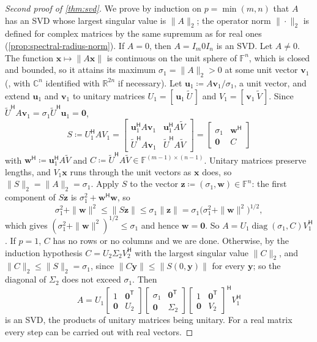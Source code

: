 \begin{proof}[Second proof of \cref{thm:svd}]
We prove by induction on $p=\min(m,n)$ that $A$ has an SVD whose largest singular value is $\|A\|_2$; the operator norm $\|\cdot\|_2$ is defined for complex matrices by the same supremum as for real ones (\cref{prop:spectral-radius-norm}). If $A=0$, then $A=I_m0I_n$ is an SVD. Let $A\ne0$. The function $\mathbf x\mapsto\|A\mathbf x\|$ is continuous on the unit sphere of $\mathbb F^n$, which is closed and bounded, so it attains its maximum $\sigma_1=\|A\|_2>0$ at some unit vector $\mathbf v_1$ (, with $\mathbb C^n$ identified with $\mathbb R^{2n}$ if necessary). Let $\mathbf u_1\coloneqq A\mathbf v_1/\sigma_1$, a unit vector, and extend $\mathbf u_1$ and $\mathbf v_1$ to unitary matrices $U_1=[\,\mathbf u_1\ \tilde U\,]$ and $V_1=[\,\mathbf v_1\ \tilde V\,]$. Since $\tilde U^{\mathsf H}A\mathbf v_1=\sigma_1\tilde U^{\mathsf H}\mathbf u_1=\mathbf 0$,
\[
S\coloneqq U_1^{\mathsf H}AV_1=\begin{bmatrix}\mathbf u_1^{\mathsf H}A\mathbf v_1&\mathbf u_1^{\mathsf H}A\tilde V\\\tilde U^{\mathsf H}A\mathbf v_1&\tilde U^{\mathsf H}A\tilde V\end{bmatrix}=\begin{bmatrix}\sigma_1&\mathbf w^{\mathsf H}\\\mathbf 0&C\end{bmatrix}
\]
with $\mathbf w^{\mathsf H}\coloneqq\mathbf u_1^{\mathsf H}A\tilde V$ and $C\coloneqq\tilde U^{\mathsf H}A\tilde V\in\mathbb F^{(m-1)\times(n-1)}$. Unitary matrices preserve lengths, and $V_1\mathbf x$ runs through the unit vectors as $\mathbf x$ does, so $\|S\|_2=\|A\|_2=\sigma_1$. Apply $S$ to the vector $\mathbf z\coloneqq(\sigma_1,\mathbf w)\in\mathbb F^n$: the first component of $S\mathbf z$ is $\sigma_1^2+\mathbf w^{\mathsf H}\mathbf w$, so
\[
\sigma_1^2+\|\mathbf w\|^2\le\|S\mathbf z\|\le\sigma_1\|\mathbf z\|=\sigma_1\bigl(\sigma_1^2+\|\mathbf w\|^2\bigr)^{1/2},
\]
which gives $(\sigma_1^2+\|\mathbf w\|^2)^{1/2}\le\sigma_1$ and hence $\mathbf w=\mathbf 0$. So $A=U_1\operatorname{diag}(\sigma_1,C)V_1^{\mathsf H}$. If $p=1$, $C$ has no rows or no columns and we are done. Otherwise, by the induction hypothesis $C=U_2\Sigma_2V_2^{\mathsf H}$ with the largest singular value $\|C\|_2$, and $\|C\|_2\le\|S\|_2=\sigma_1$, since $\|C\mathbf y\|\le\|S(0,\mathbf y)\|$ for every $\mathbf y$; so the diagonal of $\Sigma_2$ does not exceed $\sigma_1$. Then
\[
A=U_1\begin{bmatrix}1&\mathbf 0^{\mathsf T}\\\mathbf 0&U_2\end{bmatrix}\begin{bmatrix}\sigma_1&\mathbf 0^{\mathsf T}\\\mathbf 0&\Sigma_2\end{bmatrix}\begin{bmatrix}1&\mathbf 0^{\mathsf T}\\\mathbf 0&V_2\end{bmatrix}^{\mathsf H}V_1^{\mathsf H}
\]
is an SVD, the products of unitary matrices being unitary. For a real matrix every step can be carried out with real vectors.
\end{proof}

